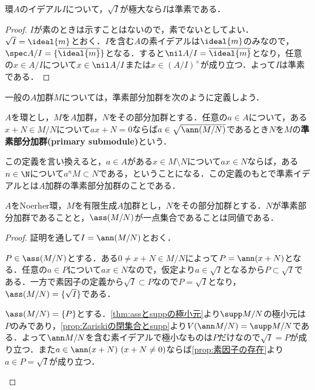 \begin{prop}\label{prop:sqrt{I}が極大なら準素}
	環$A$のイデアル$I$について，$\sqrt{I}$が極大なら$I$は準素である．
\end{prop}

\begin{proof}
	$I$が素のときは示すことはないので，素でないとしてよい．$\sqrt{I}=\ideal{m}$とおく．$I$を含む$A$の素イデアルは$\ideal{m}$のみなので，$\spec A/I=\{\bar{\ideal{m}}\}$となる．すると$\nil A/I=\bar{\ideal{m}}$となり，任意の$x\in A/I$について$x\in\nil A/I$または$x\in (A/I)^\times$が成り立つ．よって$I$は準素である．
\end{proof}

一般の$A$加群$M$については，準素部分加群を次のように定義しよう．

\begin{defi}\label{defi:準素加群}
	$A$を環とし，$M$を$A$加群，$N$をその部分加群とする．任意の$a\in A$について，ある$x+N\in M/N$について$ax+N=0$ならば$a\in\sqrt{\ann (M/N)}$であるとき$N$を$M$の\textbf{準素部分加群(primary submodule)}という．
\end{defi}

この定義を言い換えると，$a\in A$がある$x\in M\setminus N$について$ax\in N$ならば，ある$n\in\N$について$a^n M\subset N$である，ということになる．この定義のもとで準素イデアルとは$A$加群の準素部分加群のことである．

\begin{prop}\label{prop:準素部分加群とass}
	$A$をNoerher環，$M$を有限生成$A$加群とし，$N$をその部分加群とする．$N$が準素部分加群であることと，$\ass (M/N)$が一点集合であることは同値である．
\end{prop}

\begin{proof}
	証明を通して$I=\ann(M/N)$とおく．
	\begin{eqv}
		\item $P\in\ass (M/N)$とする．ある$0\neq x+N\in M/N$によって$P=\ann (x+N)$となる．任意の$a\in P$について$ax\in N$なので，仮定より$a\in\sqrt{I}$となるから$P\subset\sqrt{I}$である．一方で素因子の定義から$\sqrt{I}\subset P$なので$P=\sqrt{I}$となり，$\ass (M/N)=\{\sqrt{I}\}$である．
		
		\item $\ass(M/N)=\{P\}$とする．\ref{thm:assとsuppの極小元}より$\supp M/N$の極小元は$P$のみであり，\ref{prop:Zariskiの閉集合とsupp}より$V(\ann M/N)=\supp M/N$である．よって$\ann M/N$を含む素イデアルで極小なものは$P$だけなので$\sqrt{I}=P$が成り立つ．また$a\in\ann (x+N)~(x+N\neq0)$ならば\ref{prop:素因子の存在}より$a\in P=\sqrt{I}$が成り立つ．
	\end{eqv}
\end{proof}

